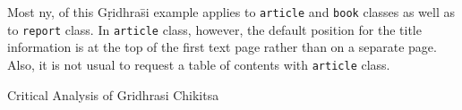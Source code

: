 \documentclass[a4paper, openright, twoside, 12pt]{book}
\begin{document}



Most \ac{ny}, of this G\d{r}idhra\={s}i example applies to \texttt{article} and \texttt{book} classes
as well as to \texttt{report} class. In \texttt{article} class, however,
the default position for the title information is at the top of
the first text page rather than on a separate page. Also, it is
not usual to request \cite{uno} a table of contents with \texttt{article} class.

Critical Analysis of Gridhrasi Chikitsa
 










\end{document}

